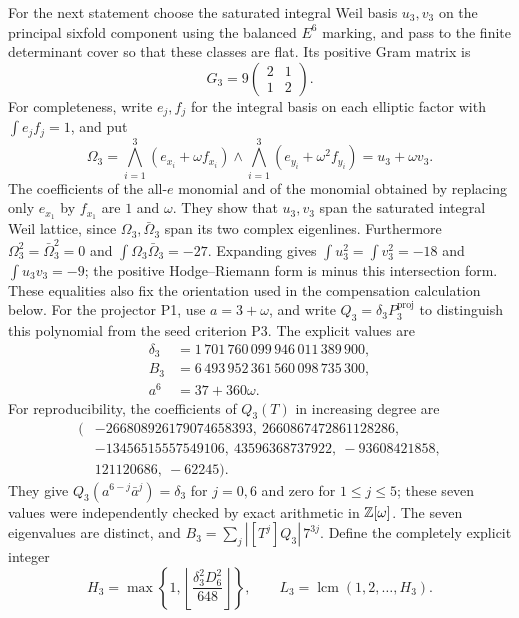 \documentclass[11pt,a4paper]{article}
\theoremstyle{definition}\newtheorem{definition}[theorem]{Definition}
\theoremstyle{remark}\newtheorem{remark}[theorem]{Remark}
\begin{document}
For the next statement choose the saturated integral Weil basis
$u_3,v_3$ on the principal sixfold component using the balanced
$E^6$ marking, and pass to the finite determinant cover so that
these classes are flat. Its positive Gram matrix is
\[
 G_3=9\begin{pmatrix}2&1\\1&2\end{pmatrix}.
\]
For completeness, write $e_j,f_j$ for the integral basis on each
elliptic factor with $\int e_jf_j=1$, and put
\[
 \Omega_3=\bigwedge_{i=1}^3(e_{x_i}+\omega f_{x_i})
          \wedge\bigwedge_{i=1}^3(e_{y_i}+\omega^2f_{y_i})
          =u_3+\omega v_3.
\]
The coefficients of the all-$e$ monomial and of the monomial
obtained by replacing only $e_{x_1}$ by $f_{x_1}$ are $1$ and
$\omega$. They show that $u_3,v_3$ span the saturated integral
Weil lattice, since $\Omega_3,\bar\Omega_3$ span its two complex
eigenlines. Furthermore $\Omega_3^2=\bar\Omega_3^2=0$ and
$\int\Omega_3\bar\Omega_3=-27$. Expanding gives
$\int u_3^2=\int v_3^2=-18$ and $\int u_3v_3=-9$;
the positive Hodge--Riemann form is minus this intersection form.
These equalities also fix the orientation used in the
compensation calculation below.
For the projector P1, use $a=3+\omega$, and write
$Q_3=\delta_3P_3^{\mathrm{proj}}$ to distinguish this polynomial
from the seed criterion P3. The explicit values are
\begin{align*}
 \delta_3&=1\,701\,760\,099\,946\,011\,389\,900,\\
 B_3&=6\,493\,952\,361\,560\,098\,735\,300,\\
 a^6&=37+360\omega.
\end{align*}
For reproducibility, the coefficients of $Q_3(T)$ in increasing
degree are
\[
\begin{split}
(&-266808926179074658393,\ 2660867472861128286,\\
 &-13456515557549106,\ 43596368737922,\ -93608421858,\\
 &121120686,\ -62245).
\end{split}
\]
They give $Q_3(a^{6-j}\bar a^j)=\delta_3$ for $j=0,6$ and zero
for $1\le j\le5$; these seven values were independently checked
by exact arithmetic in $\mathbb Z[\omega]$. The seven eigenvalues are
distinct, and
$B_3=\sum_j |[T^j]Q_3|\,7^{3j}$.
Define the completely explicit integer
\begin{equation}\label{eq:M10H3}
 H_3=\max\left\{1,
   \left\lfloor\frac{\delta_3^2D_6^2}{648}\right\rfloor\right\},
 \qquad L_3=\operatorname{lcm}(1,2,\ldots,H_3).
\end{equation}
\end{document}

